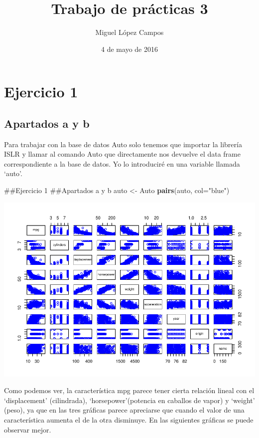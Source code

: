 \documentclass[]{article}
\title{Trabajo de prácticas 3}
\author{Miguel López Campos}
\date{4 de mayo de 2016}
\newenvironment{Shaded}{\begin{snugshade}}{\end{snugshade}}
\newcommand{\KeywordTok}[1]{\textcolor[rgb]{0.13,0.29,0.53}{\textbf{{#1}}}}
\newcommand{\DataTypeTok}[1]{\textcolor[rgb]{0.13,0.29,0.53}{{#1}}}
\newcommand{\StringTok}[1]{\textcolor[rgb]{0.31,0.60,0.02}{{#1}}}
\newcommand{\NormalTok}[1]{{#1}}
\begin{document}
\maketitle

\section{Ejercicio 1}\label{ejercicio-1}

\subsection{Apartados a y b}\label{apartados-a-y-b}

Para trabajar con la base de datos Auto solo tenemos que importar la
librería ISLR y llamar al comando Auto que directamente nos devuelve el
data frame correspondiente a la base de datos. Yo lo introduciré en una
variable llamada `auto'.

\begin{Shaded}
\begin{Highlighting}[]
\NormalTok{##Ejercicio 1}
\NormalTok{##Apartados a y b}
\NormalTok{auto <-}\StringTok{ }\NormalTok{Auto}
\KeywordTok{pairs}\NormalTok{(auto, }\DataTypeTok{col=}\StringTok{"blue"}\NormalTok{)}
\end{Highlighting}
\end{Shaded}

\includegraphics{TrabajoPracticas3_files/figure-latex/unnamed-chunk-2-1.pdf}

Como podemos ver, la característica mpg parece tener cierta relación
lineal con el `displacement' (cilindrada), `horsepower'(potencia en
caballos de vapor) y `weight' (peso), ya que en las tres gráficas parece
apreciarse que cuando el valor de una característica aumenta el de la
otra disminuye. En las siguientes gráficas se puede observar mejor.
\end{document}
